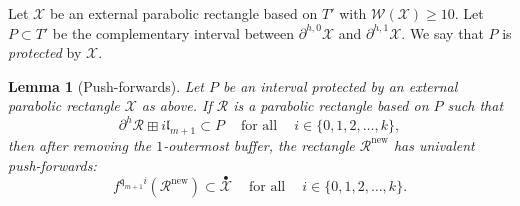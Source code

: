 \documentclass{amsart}
\renewcommand{\sp}{{\ \ }}
\newcommand{\1}{{\mathbb 1 }}
\newcommand{\upbullet}[1]{\overset{\bullet}{ #1}{}}
\newcommand{\Width}{{\mathcal W}}
\newcommand\RR{\mathcal{R}}
\newcommand\XX{\mathcal{X}}
\newcommand{\qq}{\mathfrak{q}}
\newcommand{\length}{{\mathfrak l}}
\newcommand\new{{\operatorname{new}}}
\newtheorem{lem}[thm]{Lemma}
\theoremstyle{remark}
\numberwithin{equation}{section}
\theoremstyle{definition}
\begin{document}
Let $\XX$ be an external parabolic rectangle based on $T'$ with $\Width(\XX)\ge 10$. 
 Let $P\subset T'$ be the complementary interval between $\partial ^{h,0}\XX$ and $\partial ^{h,1}\XX$. We say that $P$ is \emph{protected} by $\XX$. 
\begin{lem}[Push-forwards]
\label{lem:push forw in par int}
Let $P$ be an interval protected by an external parabolic rectangle $\XX$ as above. If $\RR$ is a parabolic rectangle based on $P$ such that \[\partial^{h} \RR\boxplus i\length_{m+1}\subset P \sp\sp\text{ for all }\sp\sp i\in\{0,1,2,\dots, k\},\]
then after removing the $1$-outermost buffer, the rectangle $\RR^\new$ has univalent push-forwards:
\begin{equation}
\label{eq:lem:push forw in par int}
 f^{\qq_{m+1}i}(\RR^\new)\subset \upbullet \XX\sp\sp\text{ for all }\sp\sp i\in\{0,1,2,\dots, k\}.
 \end{equation}
\end{lem}
\end{document}
